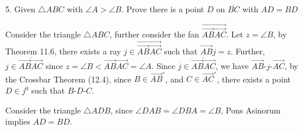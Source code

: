 \documentclass{report}
\begin{document}
    \bigbreak \noindent 
    \begin{mdframed}
        5. Given $\triangle ABC$ with $\angle A > \angle B$. Prove there is a point $D$ on $\overline{BC}$ with $AD = BD$
    \end{mdframed}
    \bigbreak \noindent 
    Consider the triangle $\triangle ABC$, further consider the fan $\overrightarrow{\overrightarrow{AB}\overrightarrow{AC}}$. Let $ z = \angle B$, by Theorem 11.6, there exists a ray $j \in \overrightarrow{\overrightarrow{AB}\overrightarrow{AC}}$ such that $\overrightarrow{AB}j = z$. Further, $j \in \overline{\overrightarrow{AB}\overrightarrow{AC}} $ since $ z = \angle B < \overrightarrow{AB}\overrightarrow{AC} = \angle A $.
    \bigbreak \noindent 
    Since $j \in \overline{\overrightarrow{AB}\overrightarrow{AC}}$, we have $ \overrightarrow{AB}\text{-}j\text{-}\overrightarrow{AC}$,  by the Crossbar Theorem (12.4), since $B \in \overrightarrow{AB}^{\circ}$, and $C \in \overrightarrow{AC}^{\circ}$, there exists a point $D \in j^{0}$ such that $ B\text{-}D\text{-}C$. 
    \begin{figure}[ht]
        \centering
        \label{fig:tri1}
    \end{figure}
    \bigbreak \noindent 
    Consider the triangle $\triangle ADB$, since $ \angle DAB = \angle DBA = \angle B$, Pons Asinorum implies $ AD = BD$.
\end{document}
